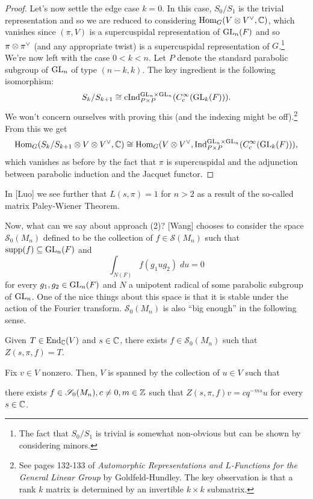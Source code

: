 \documentclass[11pt]{article}
\newcommand{\cInd}{\textup{cInd}} %
\newcommand{\Ind}{\textup{Ind}} %
\renewcommand{\S}{\mathscr{S}}
\newcommand{\supp}{\textup{supp}}
\begin{document}
\begin{proof}
Let's now settle the edge case $k=0$. In this case, $S_0/S_1$ is the trivial representation and so we are reduced to considering $\operatorname{Hom}_G(V\otimes V^{\vee},\mathbb{C})$, which vanishes since $(\pi,V)$ is a supercuspidal representation of $\textup{GL}_n(F)$ and so $\pi\otimes\pi^{\vee}$ (and any appropriate twist) is a supercuspidal representation of $G$.\footnote{The fact that $S_0/S_1$ is trivial is somewhat non-obvious but can be shown by considering minors.} We're now left with the case $0<k<n$. Let $P$ denote the standard parabolic subgroup of $\textup{GL}_n$ of type $(n-k,k)$. The key ingredient is the following isomorphism:
$$S_k/S_{k+1}\iso\cInd_{P\times P}^{\GL_n\times\GL_n}(C_c^{\infty}(\GL_k(F))).$$
We won't concern ourselves with proving this (and the indexing might be off).\footnote{See pages 132-133 of \emph{Automorphic Representations and $L$-Functions for the General Linear Group} by Goldfeld-Hundley. The key observation is that a rank $k$ matrix is determined by an invertible $k\times k$ submatrix.} From this we get 
$$\Hom_G(S_k/S_{k+1}\tensor V\tensor V^{\vee},\C)\iso\Hom_G(V\tensor V^{\vee},\Ind_{P\times P}^{\GL_n\times\GL_n}(C_c^{\infty}(\GL_k(F))),$$
which vanishes as before by the fact that $\pi$ is supercuspidal and the adjunction between parabolic induction and the Jacquet functor.
\end{proof}

\begin{remark}
In [Luo] we see further that $L(s,\pi)=1$ for $n>2$ as a result of the so-called matrix Paley-Wiener Theorem.
\end{remark}

Now, what can we say about approach (2)? [Wang] chooses to consider the space $\S_0(M_n)$ defined to be the collection of $f\in\S(M_n)$ such that $\supp(f)\subset\GL_n(F)$ and 
$$\int_{N(F)}f(g_1ug_2)\;du=0$$
for every $g_1,g_2\in\textup{GL}_n(F)$ and $N$ a unipotent radical of some parabolic subgroup of $\textup{GL}_n$. One of the nice things about this space is that it is stable under the action of the Fourier transform. $\S_0(M_n)$ is also ``big enough'' in the following sense.

\begin{proposition}
\hfill
\begin{enum}{\alph}
\item Given $T\in\operatorname{End}_{\mathbb{C}}(V)$ and $s\in\mathbb{C}$, there exists $f\in\S_0(M_n)$ such that $Z(s,\pi,f)=T$.

\item Fix $v\in V$ nonzero. Then, $V$ is spanned by the collection of $u\in V$ such that 
\begin{center}
there exists $f\in\S_0(M_n),c\neq0,m\in\Z$ such that $Z(s,\pi,f)v=cq^{-ms}u$ for every $s\in\mathbb{C}$.
\end{center}
\end{enum}
\end{proposition}
\end{document}
